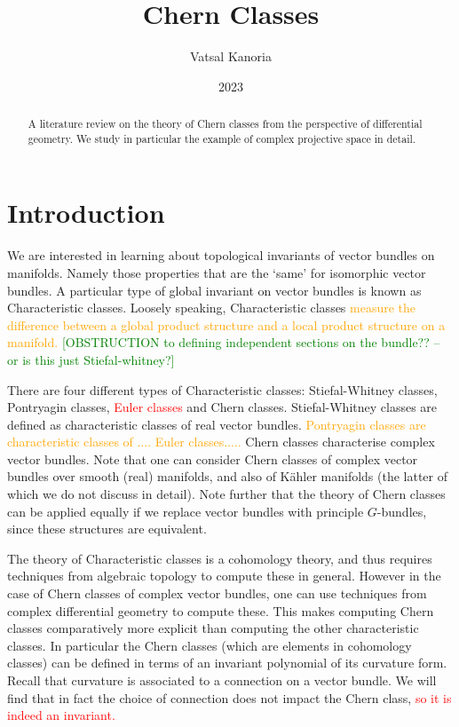 \documentclass[a4paper]{article}
\theoremstyle{definition} \newtheorem*{definition}{Definition}
\theoremstyle{definition} \newtheorem*{definitions}{Definitions}
\theoremstyle{plain} \newtheorem{theorem}{Theorem}[section]
\theoremstyle{plain} \newtheorem{proposition}[theorem]{Proposition}
\theoremstyle{plain} \newtheorem{corollary}[theorem]{Corollary}
\theoremstyle{plain} \newtheorem{lemma}[theorem]{Lemma}
\theoremstyle{plain} \newtheorem{example}[theorem]{Example}
\newcommand{\checkCorrect}[1]{\textcolor{red}{#1}}
\newcommand{\understandBetter}[1]{\textcolor{orange}{#1}}
\newcommand{\finish}[1]{\textcolor{green}{#1}}
\begin{document}
\title{Chern Classes}
\author{Vatsal Kanoria}
\date{2023}
\maketitle

\begin{abstract}
A literature review on the theory of Chern classes from the perspective of differential geometry. We study in particular the example of complex projective space in detail. 
\end{abstract}

\tableofcontents

\section{Introduction}

We are interested in learning about topological invariants of vector bundles on manifolds. Namely those properties that are the `same' for isomorphic vector bundles. A particular type of global invariant on vector bundles is known as Characteristic classes. Loosely speaking, Characteristic classes \understandBetter{measure the difference between a global product structure and a local product structure on a manifold.} \finish{[OBSTRUCTION to defining independent sections on the bundle?? -- or is this just Stiefal-whitney?]}

There are four different types of Characteristic classes: Stiefal-Whitney classes, Pontryagin classes, \checkCorrect{Euler classes} and Chern classes. Stiefal-Whitney classes are defined as characteristic classes of real vector bundles. \understandBetter{Pontryagin classes are characteristic classes of .... Euler classes.....}
Chern classes characterise complex vector bundles. 
Note that one can consider Chern classes of complex vector bundles over smooth (real) manifolds, and also of K{\"a}hler manifolds (the latter of which we do not discuss in detail). Note further that the theory of Chern classes can be applied equally if we replace vector bundles with principle $G$-bundles, since these structures are equivalent. 

The theory of Characteristic classes is a cohomology theory, and thus requires techniques from algebraic topology to compute these in general. However in the case of Chern classes of complex vector bundles, one can use techniques from complex differential geometry to compute these. This makes computing Chern classes comparatively more explicit than computing the other characteristic classes. In particular the Chern classes (which are elements in cohomology classes) can be defined in terms of an invariant polynomial of its curvature form. Recall that curvature is associated to a connection on a vector bundle. We will find that in fact the choice of connection does not impact the Chern class, \checkCorrect{so it is indeed an invariant.}
\end{document}
